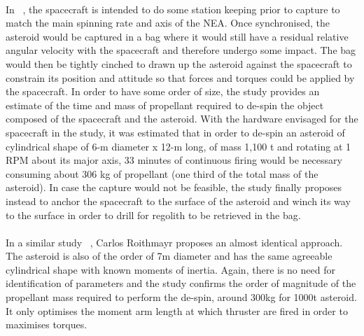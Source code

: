\paragraph{} In ~\cite{Brophy2012}, the spacecraft is intended to do some station keeping prior to capture to match the main spinning rate and axis of the NEA. Once synchronised, the asteroid would be captured in a bag where it would still have a residual relative angular velocity with the spacecraft and therefore undergo some impact. The bag would then be tightly cinched to drawn up the asteroid against the spacecraft to constrain its position and attitude so that forces and torques could be applied by the spacecraft. In order to have some order of size, the study provides an estimate of the time and mass of propellant required to de-spin the object composed of the spacecraft and the asteroid. With the hardware envisaged for the spacecraft in the study, it was estimated that in order to de-spin an asteroid of cylindrical shape of 6-m diameter x 12-m long, of mass 1,100 t and rotating at 1 RPM about its major axis, 33 minutes of continuous firing would be necessary consuming about 306 kg of propellant (one third of the total mass of the asteroid). In case the capture would not be feasible, the study finally proposes instead to anchor the spacecraft to the surface of the asteroid and winch its way to the surface in order to drill for regolith to be retrieved in the bag.
\paragraph{}In a similar study ~\cite{Roithmayr2013}, Carlos Roithmayr proposes an almost identical approach. The asteroid is also of the order of 7m diameter and has the same agreeable cylindrical shape with known moments of inertia. Again, there is no need for identification of parameters and the study confirms the order of magnitude of the propellant mass required to perform the de-spin, around 300kg for 1000t asteroid. It only optimises the moment arm length at which thruster are fired in order to maximises torques.
